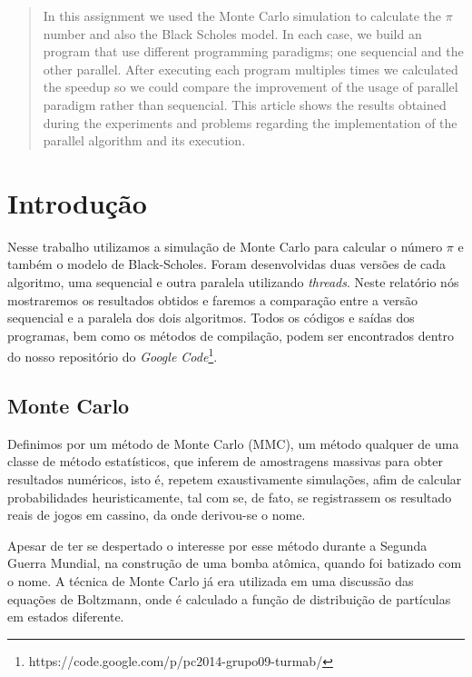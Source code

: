 \documentclass[11pt,twoside]{article}
\begin{document}

\tableofcontents
\listoffigures
\listoftables
\lstlistoflistings

\clearpage

\begin{abstract} 
    In this assignment we used the Monte Carlo simulation to calculate the $\pi$ number and
    also the Black Scholes model. In each case, we build an program that use different
    programming paradigms; one sequencial and the other parallel. After executing each
    program multiples times we calculated the speedup so we could compare the improvement
    of the usage of parallel paradigm rather than sequencial. This article shows the results
    obtained during the experiments and problems regarding the implementation of the 
    parallel algorithm and its execution.
\end{abstract}


\section{Introdução}

    Nesse trabalho utilizamos a simulação de Monte Carlo para calcular o número $\pi$ e 
    também o modelo de Black-Scholes. Foram desenvolvidas duas versões de
    cada algoritmo, uma sequencial e outra paralela utilizando \textit{threads}. Neste relatório
    nós mostraremos os resultados obtidos e faremos a comparação entre a versão sequencial e a
    paralela dos dois algoritmos. Todos os códigos e saídas dos programas, bem como os métodos
    de compilação, podem ser encontrados dentro do nosso repositório do 
    {\it Google Code}\footnote{https://code.google.com/p/pc2014-grupo09-turmab/\label{fnt:code}}.

    \subsection{Monte Carlo}
    
        Definimos por um método de Monte Carlo (MMC), um método qualquer de uma classe
        de método estatísticos, que inferem de amostragens massivas para obter resultados
        numéricos, isto é, repetem exaustivamente simulações, afim de calcular probabilidades
        heuristicamente, tal com se, de fato, se registrassem os resultado reais de jogos em
        cassino, da onde derivou-se o nome.
    
        Apesar de ter se despertado o interesse por esse método durante a Segunda Guerra
        Mundial, na construção de uma bomba atômica, quando foi batizado com o nome. A
        técnica de Monte Carlo já era utilizada em uma discussão das equações de Boltzmann,
        onde é calculado a função de distribuição de partículas em estados diferente.
        
\end{document}
